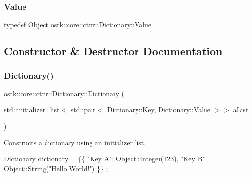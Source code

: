 \subsubsection{\texorpdfstring{Value}{Value}}
{\footnotesize\ttfamily typedef \hyperlink{classostk_1_1core_1_1ctnr_1_1_object}{Object} \hyperlink{classostk_1_1core_1_1ctnr_1_1_dictionary_ace6ab82268031e972455affca8730c9c}{ostk\+::core\+::ctnr\+::\+Dictionary\+::\+Value}}



\subsection{Constructor \& Destructor Documentation}
\mbox{\label{classostk_1_1core_1_1ctnr_1_1_dictionary_a17166f1489683b8fcc5da6537f29de13}} 
\subsubsection{\texorpdfstring{Dictionary()}{Dictionary()}\hspace{0.1cm}{\footnotesize\ttfamily [1/2]}}
{\footnotesize\ttfamily ostk\+::core\+::ctnr\+::\+Dictionary\+::\+Dictionary (\begin{DoxyParamCaption}\item[{std\+::initializer\+\_\+list$<$ std\+::pair$<$ \hyperlink{classostk_1_1core_1_1ctnr_1_1_dictionary_aa3b171525039535f342d271d27f90407}{Dictionary\+::\+Key}, \hyperlink{classostk_1_1core_1_1ctnr_1_1_dictionary_ace6ab82268031e972455affca8730c9c}{Dictionary\+::\+Value} $>$$>$}]{a\+List }\end{DoxyParamCaption})}



Constructs a dictionary using an initializer list. 


\begin{DoxyCode}
\hyperlink{classostk_1_1core_1_1ctnr_1_1_dictionary_a17166f1489683b8fcc5da6537f29de13}{Dictionary} dictionary = \{\{ \textcolor{stringliteral}{"Key A"}: \hyperlink{classostk_1_1core_1_1ctnr_1_1_object_af3bef3ae331e8e55662bf91a4cd5026f}{Object::Integer}(123), \textcolor{stringliteral}{"Key B"}: 
      \hyperlink{classostk_1_1core_1_1ctnr_1_1_object_aab792cff0163e7cd57c49afe36eea380}{Object::String}(\textcolor{stringliteral}{"Hello World!"}) \}\} ;
\end{DoxyCode}



